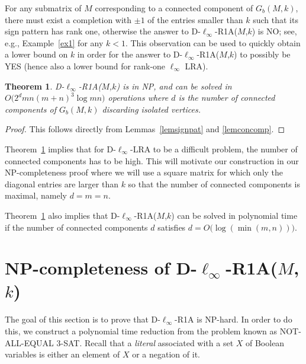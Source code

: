 \documentclass[a4paper,11pt]{article}
\newtheorem{theorem}{Theorem}
\numberwithin{equation}{section}
\begin{document}
For any submatrix of $M$ corresponding to a connected component of $G_b(M,k)$, there must exist a completion with $\pm 1$ of the entries smaller than $k$ such that its sign pattern has rank one, otherwise the answer to D-$\ell_\infty$-R1A($M$,$k$) is NO; 
see, e.g., Example~\ref{ex1} for any $k < 1$. 
This observation can be used to quickly obtain a lower bound on $k$ in order for the answer to D-$\ell_\infty$-R1A($M$,$k$) to possibly be YES 
(hence also a lower bound for rank-one $\ell_{\infty}$ LRA). 



\begin{theorem} \label{theoremNP} 
D-$\ell_\infty$-R1A($M$,$k$) is in NP, 
and can be solved in $O\big( 2^{d} mn (m+n)^3 \log mn \big)$ 
operations where $d$ is the number of connected components of $G_b(M,k)$ discarding isolated vertices.   
\end{theorem}
\begin{proof}
This follows directly from Lemmas~\ref{lemsignpat} and \ref{lemconcomp}. 
\end{proof}
Theorem~\ref{theoremNP} implies that for D-$\ell_\infty$-LRA to be a difficult problem, the number of connected components has to be high. 
This will motivate our construction in our NP-completeness proof where we will use a square matrix for which only the diagonal entries are larger than $k$ so that the number of connected components is maximal, namely $d=m=n$. 



Theorem~\ref{theoremNP} also implies that D-$\ell_\infty$-R1A($M$,$k$) can be solved in polynomial time 
if the number of connected components $d$ satisfies $d = O\big(\log(\min(m,n)) \big)$. 






\section{NP-completeness of D-$\ell_\infty$-R1A($M$,$k$)} \label{NPcompl}

The goal of this section is to prove that D-$\ell_\infty$-R1A is NP-hard. In order to do this, we construct a polynomial time reduction from the problem known as NOT-ALL-EQUAL 3-SAT. Recall that a \textit{literal} associated with a set $X$ of Boolean variables is either an element of $X$ or a negation of it. 
\end{document}
